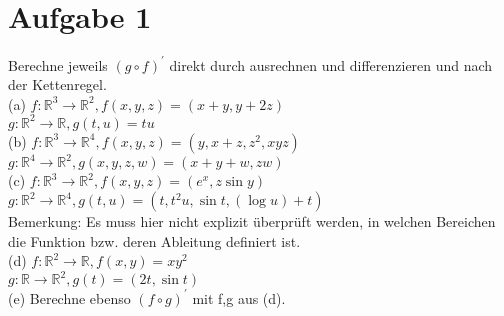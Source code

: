\documentclass{scrartcl}
\begin{document}
\section*{Aufgabe 1}

Berechne jeweils $(g\circ f)^\prime$ direkt durch ausrechnen und differenzieren und nach der Kettenregel.\\
(a) $f:\mathbb{R}^3\rightarrow\mathbb{R}^2, f(x,y,z)=(x+y,y+2z)$\\
$g:\mathbb{R}^2\rightarrow\mathbb{R}, g(t,u)=tu$\\
(b) $f:\mathbb{R}^3\rightarrow\mathbb{R}^4, f(x,y,z)=(y,x+z,z^2,xyz)$\\
$g:\mathbb{R}^4\rightarrow\mathbb{R}^2, g(x,y,z,w)=(x+y+w,zw)$\\
(c) $f:\mathbb{R}^3\rightarrow\mathbb{R}^2, f(x,y,z)=(e^x,z\sin y)$\\
$g:\mathbb{R}^2\rightarrow\mathbb{R}^4, g(t,u)=(t,t^2u,\sin t,(\log u)+t)$\\
Bemerkung: Es muss hier nicht explizit \"uberpr\"uft werden, 
in welchen Bereichen die Funktion bzw. deren Ableitung definiert ist.\\
(d) $f:\mathbb{R}^2\rightarrow\mathbb{R}, f(x,y)=xy^2$\\
$g:\mathbb{R}\rightarrow\mathbb{R}^2, g(t)=(2t,\sin t)$\\
(e) Berechne ebenso $(f\circ g)^\prime$ mit f,g aus (d).\\
\end{document}
